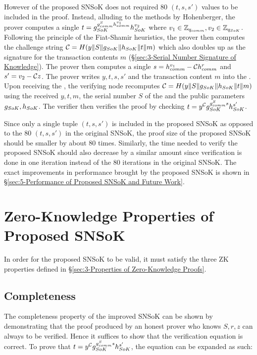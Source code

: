 However of the proposed SNSoK does not required 80 $(t,s,s')$ values to be included in the proof. Instead, alluding to the methods by Hohenberger, the prover computes a single $t=g_{SoK}^{g_{comm}^{S}h_{comm}^{v_1}}h_{SoK}^{v_2}$ where $v_1\in\mathbb{Z}_{q_{comm}},v_2\in\mathbb{Z}_{q_{SoK}}$. Following the principle of the Fiat-Shamir heuristics, the prover then computes the challenge string $\mathcal{C}=H(y \| S \| g_{SoK} \| h_{SoK} \| t \| m)$ which also doubles up as the signature for the transaction contents $m$ (\S\ref{sec:3-Serial Number Signature of Knowledge}). The prover then computes a single $s=h_{comm}^{v_1}-\mathcal{C}h_{comm}^{r}$ and $s'=v_2-\mathcal{C} z$. The prover writes $y,t,s,s'$ and the transaction content $m$ into the . Upon receiving the , the verifying node recomputes $\mathcal{C}=H(y \| S \| g_{SoK} \| h_{SoK} \| t \| m)$ using the received $y,t,m$, the serial number $S$ of the \kwCoin{} and the public parameters $g_{SoK},h_{SoK}$. The verifier then verifies the proof by checking $t=y^{\mathcal{C}}g_{SoK}^{g_{comm}^{S}s}h_{SoK}^{s'}$.

Since only a single tuple $(t,s,s')$ is included in the proposed SNSoK as opposed to the 80 $(t,s,s')$ in the original SNSoK, the proof size of the proposed SNSoK should be smaller by about 80 times. Similarly, the time needed to verify the proposed SNSoK should also decrease by a similar amount since verification is done in one iteration instead of the 80 iterations in the original SNSoK. The exact improvements in performance brought by the proposed SNSoK is shown in \S\ref{sec:5-Performance of Proposed SNSoK and Future Work}.

\section{Zero-Knowledge Properties of Proposed SNSoK}
\label{sec:5-Zero-Knowledge Properties of Proposed SNSoK}
In order for the proposed SNSoK to be valid, it must satisfy the three ZK properties defined in \S\ref{sec:3-Properties of Zero-Knowledge Proofs}.

\subsection{Completeness}
The completeness property of the improved SNSoK can be shown by demonstrating that the proof produced by an honest prover who knows $S,r,z$ can always to be verified. Hence it suffices to show that the verification equation is correct. To prove that $t=y^{\mathcal{C}}g_{SoK}^{g_{comm}^{S}s}h_{SoK}^{s'}$, the equation can be expanded as such:

